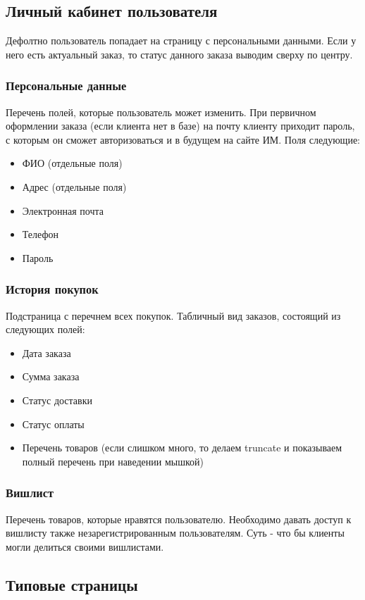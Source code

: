 \documentclass[DIV=calc, paper=a4, fontsize=11pt]{scrartcl} %
\begin{document}
\subsection{Личный кабинет пользователя}
Дефолтно пользователь попадает на страницу с персональными данными. Если у него есть актуальный заказ, то статус данного заказа выводим сверху по центру.

\subsubsection{Персональные данные}
Перечень полей, которые пользователь может изменить. При первичном оформлении заказа (если клиента нет в базе) на почту клиенту приходит пароль, с которым он сможет авторизоваться и в будущем на сайте ИМ. Поля следующие:
\begin{itemize}
	\item ФИО (отдельные поля)
	\item Адрес (отдельные поля)
	\item Электронная почта
	\item Телефон
	\item Пароль
\end{itemize}

\subsubsection{История покупок}
Подстраница с перечнем всех покупок. Табличный вид заказов, состоящий из следующих полей:
\begin{itemize}
	\item Дата заказа
	\item Сумма заказа
	\item Статус доставки
	\item Статус оплаты
	\item Перечень товаров (если слишком много, то делаем truncate и показываем полный перечень при наведении мышкой)
\end{itemize}

\subsubsection{Вишлист}
Перечень товаров, которые нравятся пользователю. Необходимо давать доступ к вишлисту также незарегистрированным пользователям. Суть - что бы клиенты могли делиться своими вишлистами. 

\subsection{Типовые страницы}
\end{document}
